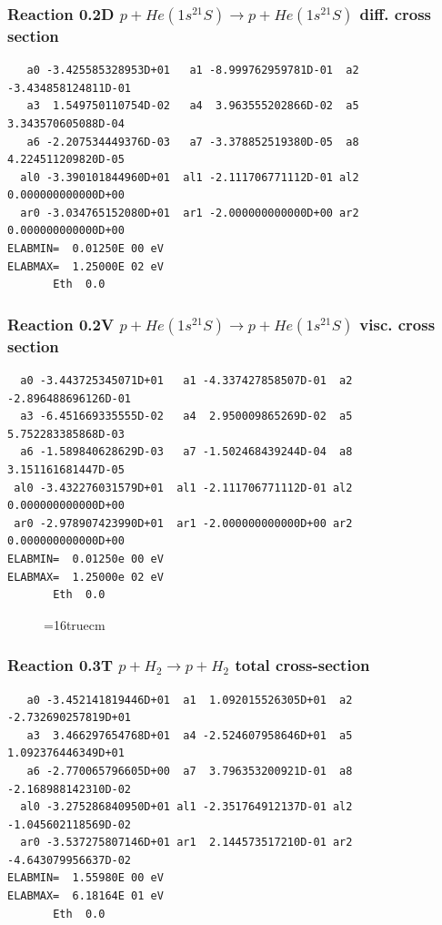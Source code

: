 \documentclass[12pt,dvipdfmx]{article}
\begin{document}
\subsubsection{
Reaction 0.2D    $p + He(1s^21S) \rightarrow p + He (1s^21S) $ diff. cross
section }


\begin{small}\begin{verbatim}
   a0 -3.425585328953D+01   a1 -8.999762959781D-01  a2 -3.434858124811D-01
   a3  1.549750110754D-02   a4  3.963555202866D-02  a5  3.343570605088D-04
   a6 -2.207534449376D-03   a7 -3.378852519380D-05  a8  4.224511209820D-05
  al0 -3.390101844960D+01  al1 -2.111706771112D-01 al2  0.000000000000D+00
  ar0 -3.034765152080D+01  ar1 -2.000000000000D+00 ar2  0.000000000000D+00
ELABMIN=  0.01250E 00 eV
ELABMAX=  1.25000E 02 eV
       Eth  0.0
\end{verbatim}\end{small}


\subsubsection{
Reaction 0.2V   $ p + He(1s^21S) \rightarrow p + He (1s^21S) $ visc. cross
section }


\begin{small}\begin{verbatim}
  a0 -3.443725345071D+01   a1 -4.337427858507D-01  a2 -2.896488696126D-01
  a3 -6.451669335555D-02   a4  2.950009865269D-02  a5  5.752283385868D-03
  a6 -1.589840628629D-03   a7 -1.502468439244D-04  a8  3.151161681447D-05
 al0 -3.432276031579D+01  al1 -2.111706771112D-01 al2  0.000000000000D+00
 ar0 -2.978907423990D+01  ar1 -2.000000000000D+00 ar2  0.000000000000D+00
ELABMIN=  0.01250e 00 eV
ELABMAX=  1.25000e 02 eV
       Eth  0.0
\end{verbatim}\end{small}


\begin{figure} \label{0.2}
\epsfxsize=16truecm
\end{figure}
\newpage

\subsubsection{
Reaction 0.3T    $p + H_2 \rightarrow p + H_2 $  total cross-section
}
\begin{small}\begin{verbatim}
   a0 -3.452141819446D+01  a1  1.092015526305D+01  a2 -2.732690257819D+01
   a3  3.466297654768D+01  a4 -2.524607958646D+01  a5  1.092376446349D+01
   a6 -2.770065796605D+00  a7  3.796353200921D-01  a8 -2.168988142310D-02
  al0 -3.275286840950D+01 al1 -2.351764912137D-01 al2 -1.045602118569D-02
  ar0 -3.537275807146D+01 ar1  2.144573517210D-01 ar2 -4.643079956637D-02
ELABMIN=  1.55980E 00 eV
ELABMAX=  6.18164E 01 eV
       Eth  0.0
\end{verbatim}\end{small}
\end{document}
